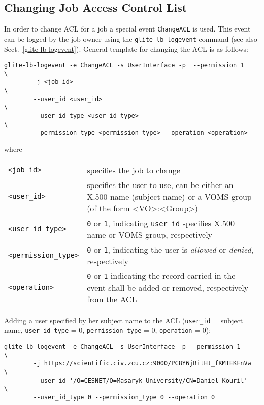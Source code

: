 \subsection{Changing Job Access Control List}
\label{change_acl}

In order to change ACL for a job a special event \verb'ChangeACL' is used. This
event can be logged by the job owner using the \verb'glite-lb-logevent' command
(see also Sect.~\ref{glite-lb-logevent}). General template for changing the ACL
is as follows:

\begin{verbatim}
glite-lb-logevent -e ChangeACL -s UserInterface -p	--permission 1          \
        -j <job_id>                                                     \
        --user_id <user_id>                                             \
        --user_id_type <user_id_type>                                   \
        --permission_type <permission_type> --operation <operation>
\end{verbatim}

where

\begin{tabularx}{\textwidth}{lX}
\verb'<job_id>'    & specifies the job to change \\
\verb'<user_id>'   & specifies the user to use, can be either an X.500 name
                     (subject name) or a VOMS group (of the form <VO>:<Group>)\\
\verb'<user_id_type>'    & \verb'0' or \verb'1', indicating \verb'user_id'
                     specifies X.500 name or VOMS group, respectively \\
\verb'<permission_type>' & \verb'0' or \verb'1', indicating the user is 
                     \textit{allowed} or \textit{denied}, respectively \\
\verb'<operation>' & \verb'0' or \verb'1' indicating the record carried in
                     the event shall be added or removed, respectively from
		     the ACL \\
\end{tabularx}

Adding a user specified by her subject name to the ACL (\verb'user_id' =
subject name, \verb'user_id_type' = 0, \verb'permission_type' = 0,
\verb'operation' = 0):

\begin{verbatim}
glite-lb-logevent -e ChangeACL -s UserInterface -p --permission 1       \
        -j https://scientific.civ.zcu.cz:9000/PC8Y6jBitHt_fKMTEKFnVw    \
        --user_id '/O=CESNET/O=Masaryk University/CN=Daniel Kouril'     \
        --user_id_type 0 --permission_type 0 --operation 0
\end{verbatim}

